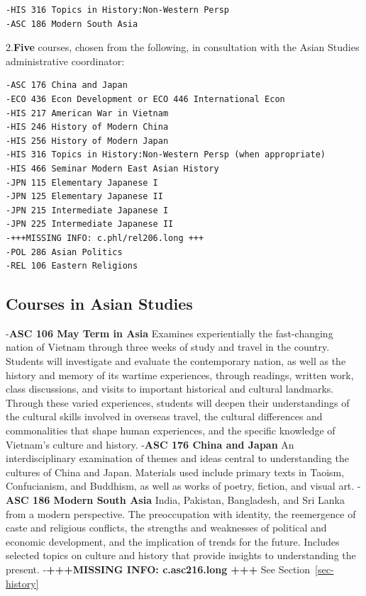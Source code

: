 \documentclass[
  letterpaper,
]{scrbook}
\begin{document}
\begin{verbatim}
-HIS 316 Topics in History:Non-Western Persp
-ASC 186 Modern South Asia
\end{verbatim}

2.\textbf{Five} courses, chosen from the following, in consultation with
the Asian Studies administrative coordinator:

\begin{verbatim}
-ASC 176 China and Japan
-ECO 436 Econ Development or ECO 446 International Econ
-HIS 217 American War in Vietnam
-HIS 246 History of Modern China
-HIS 256 History of Modern Japan
-HIS 316 Topics in History:Non-Western Persp (when appropriate)
-HIS 466 Seminar Modern East Asian History
-JPN 115 Elementary Japanese I
-JPN 125 Elementary Japanese II
-JPN 215 Intermediate Japanese I
-JPN 225 Intermediate Japanese II
-+++MISSING INFO: c.phl/rel206.long +++
-POL 286 Asian Politics
-REL 106 Eastern Religions
\end{verbatim}

\subsection{Courses in Asian Studies}\label{courses-in-asian-studies}

-\textbf{ASC 106 May Term in Asia} Examines experientially the
fast-changing nation of Vietnam through three weeks of study and travel
in the country. Students will investigate and evaluate the contemporary
nation, as well as the history and memory of its wartime experiences,
through readings, written work, class discussions, and visits to
important historical and cultural landmarks. Through these varied
experiences, students will deepen their understandings of the cultural
skills involved in overseas travel, the cultural differences and
commonalities that shape human experiences, and the specific knowledge
of Vietnam's culture and history. -\textbf{ASC 176 China and Japan} An
interdisciplinary examination of themes and ideas central to
understanding the cultures of China and Japan. Materials used include
primary texts in Taoism, Confucianism, and Buddhism, as well as works of
poetry, fiction, and visual art. -\textbf{ASC 186 Modern South Asia}
India, Pakistan, Bangladesh, and Sri Lanka from a modern perspective.
The preoccupation with identity, the reemergence of caste and religious
conflicts, the strengths and weaknesses of political and economic
development, and the implication of trends for the future. Includes
selected topics on culture and history that provide insights to
understanding the present. -\textbf{+++MISSING INFO: c.asc216.long +++}
See Section~\ref{sec-history}
\end{document}
